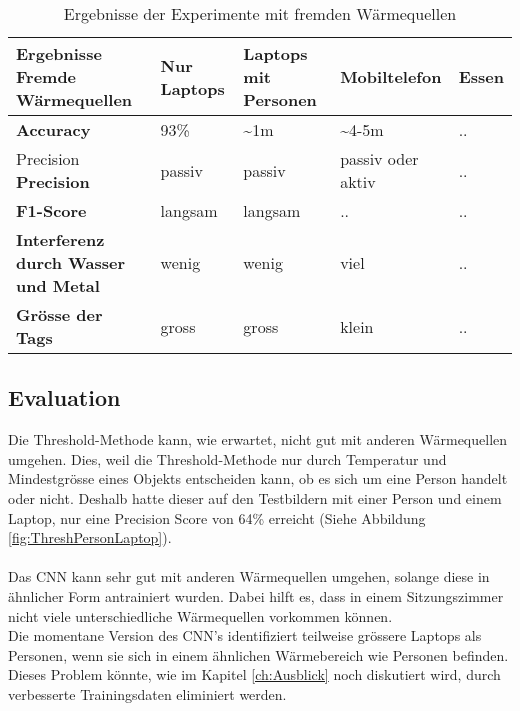 \begin{table}[H]
	\begin{tabularx}{\textwidth}{|X|X|X|X|X|}
		\hline
		\textbf{Ergebnisse Fremde Wärmequellen} & \textbf{Nur Laptops} & \textbf{Laptops mit Personen} & \textbf{Mobiltelefon} & \textbf{Essen}\\
		\hline 
		\textbf{\gls{Accuracy}} & 93\% & \textasciitilde 1m & \textasciitilde 4-5m & ..\\
		\hline  Precision
		\textbf{\gls{Precision}} & passiv & passiv & passiv oder aktiv & ..\\
		\hline
		\textbf{F1-Score} & langsam & langsam & .. & ..\\
		\hline
		\textbf{Interferenz durch Wasser und Metal} & wenig & wenig & viel & ..\\
		\hline
		\textbf{Grösse der Tags} & gross & gross & klein & ..\\
		\hline
	\end{tabularx}
	\caption{Ergebnisse der Experimente mit fremden Wärmequellen}
	\label{tbl:heatSources}
\end{table}

\subsection{Evaluation}

Die Threshold-Methode kann, wie erwartet, nicht gut mit anderen Wärmequellen umgehen. Dies, weil die Threshold-Methode nur durch Temperatur und Mindestgrösse eines Objekts entscheiden kann, ob es sich um eine Person handelt oder nicht. Deshalb hatte dieser auf den Testbildern mit einer Person und einem Laptop, nur eine Precision Score von 64\% erreicht (Siehe Abbildung \ref{fig:ThreshPersonLaptop}).\\
\\
Das \gls{CNN} kann sehr gut mit anderen Wärmequellen umgehen, solange diese in ähnlicher Form antrainiert wurden. Dabei hilft es, dass in einem Sitzungszimmer nicht viele unterschiedliche Wärmequellen vorkommen können. \\
Die momentane Version des \gls{CNN}'s identifiziert teilweise grössere Laptops als Personen, wenn sie sich in einem ähnlichen Wärmebereich wie Personen befinden. Dieses Problem könnte, wie im Kapitel \ref{ch:Ausblick} noch diskutiert wird, durch verbesserte Trainingsdaten eliminiert werden.

